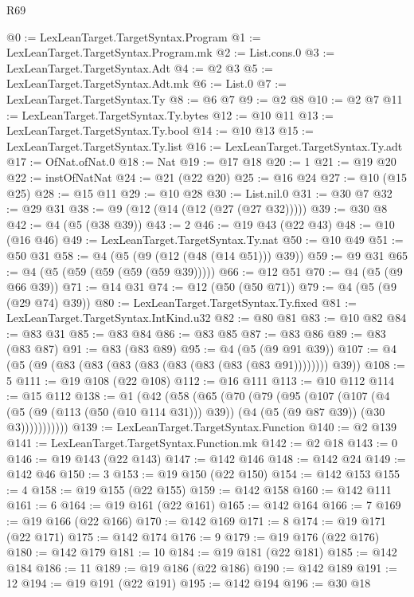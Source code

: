 \begin{lexlean}{R69}
\begin{coremodule}
@0 := LexLeanTarget.TargetSyntax.Program
@1 := LexLeanTarget.TargetSyntax.Program.mk
@2 := List.cons.{0}
@3 := LexLeanTarget.TargetSyntax.Adt
@4 := @2 @3
@5 := LexLeanTarget.TargetSyntax.Adt.mk
@6 := List.{0}
@7 := LexLeanTarget.TargetSyntax.Ty
@8 := @6 @7
@9 := @2 @8
@10 := @2 @7
@11 := LexLeanTarget.TargetSyntax.Ty.bytes
@12 := @10 @11
@13 := LexLeanTarget.TargetSyntax.Ty.bool
@14 := @10 @13
@15 := LexLeanTarget.TargetSyntax.Ty.list
@16 := LexLeanTarget.TargetSyntax.Ty.adt
@17 := OfNat.ofNat.{0}
@18 := Nat
@19 := @17 @18
@20 := 1
@21 := @19 @20
@22 := instOfNatNat
@24 := @21 (@22 @20)
@25 := @16 @24
@27 := @10 (@15 @25)
@28 := @15 @11
@29 := @10 @28
@30 := List.nil.{0}
@31 := @30 @7
@32 := @29 @31
@38 := @9 (@12 (@14 (@12 (@27 (@27 @32)))))
@39 := @30 @8
@42 := @4 (@5 (@38 @39))
@43 := 2
@46 := @19 @43 (@22 @43)
@48 := @10 (@16 @46)
@49 := LexLeanTarget.TargetSyntax.Ty.nat
@50 := @10 @49
@51 := @50 @31
@58 := @4 (@5 (@9 (@12 (@48 (@14 @51))) @39))
@59 := @9 @31
@65 := @4 (@5 (@59 (@59 (@59 (@59 @39)))))
@66 := @12 @51
@70 := @4 (@5 (@9 @66 @39))
@71 := @14 @31
@74 := @12 (@50 (@50 @71))
@79 := @4 (@5 (@9 (@29 @74) @39))
@80 := LexLeanTarget.TargetSyntax.Ty.fixed
@81 := LexLeanTarget.TargetSyntax.IntKind.u32
@82 := @80 @81
@83 := @10 @82
@84 := @83 @31
@85 := @83 @84
@86 := @83 @85
@87 := @83 @86
@89 := @83 (@83 @87)
@91 := @83 (@83 @89)
@95 := @4 (@5 (@9 @91 @39))
@107 := @4 (@5 (@9 (@83 (@83 (@83 (@83 (@83 (@83 (@83 (@83 @91)))))))) @39))
@108 := 5
@111 := @19 @108 (@22 @108)
@112 := @16 @111
@113 := @10 @112
@114 := @15 @112
@138 := @1
    (@42
      (@58
        (@65
          (@70
            (@79
              (@95
                (@107
                  (@107
                    (@4
                      (@5 (@9 (@113 (@50 (@10 @114 @31))) @39))
                      (@4 (@5 (@9 @87 @39)) (@30 @3)))))))))))
@139 := LexLeanTarget.TargetSyntax.Function
@140 := @2 @139
@141 := LexLeanTarget.TargetSyntax.Function.mk
@142 := @2 @18
@143 := 0
@146 := @19 @143 (@22 @143)
@147 := @142 @146
@148 := @142 @24
@149 := @142 @46
@150 := 3
@153 := @19 @150 (@22 @150)
@154 := @142 @153
@155 := 4
@158 := @19 @155 (@22 @155)
@159 := @142 @158
@160 := @142 @111
@161 := 6
@164 := @19 @161 (@22 @161)
@165 := @142 @164
@166 := 7
@169 := @19 @166 (@22 @166)
@170 := @142 @169
@171 := 8
@174 := @19 @171 (@22 @171)
@175 := @142 @174
@176 := 9
@179 := @19 @176 (@22 @176)
@180 := @142 @179
@181 := 10
@184 := @19 @181 (@22 @181)
@185 := @142 @184
@186 := 11
@189 := @19 @186 (@22 @186)
@190 := @142 @189
@191 := 12
@194 := @19 @191 (@22 @191)
@195 := @142 @194
@196 := @30 @18

\end{coremodule}
\end{lexlean}
